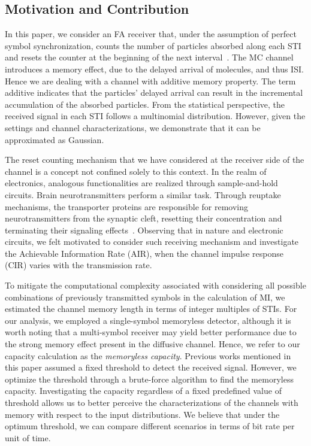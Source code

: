 \documentclass[journal]{IEEEtranTCOM}
\begin{document}
\subsection{Motivation and Contribution}

In this paper, we consider an FA receiver that, under the assumption of perfect symbol synchronization, counts the number of particles absorbed along each STI and resets the counter at the beginning of the next interval~\cite{ghavami2015information}. The MC channel introduces a memory effect, due to the delayed arrival of molecules, and thus ISI. Hence we are dealing with a channel with additive memory property. The term additive indicates that the particles' delayed arrival can result in the incremental accumulation of the absorbed particles.
From the statistical perspective, the received signal in each STI follows a multinomial distribution. However, given the settings and channel characterizations, we demonstrate that it can be approximated as Gaussian.

The reset counting mechanism that we have considered at the receiver side of the channel is a concept not confined solely to this context. In the realm of electronics, analogous functionalities are realized through sample-and-hold circuits. Brain neurotransmitters perform a similar task. Through reuptake mechanisms, the transporter proteins are responsible for removing neurotransmitters from the synaptic cleft, resetting their concentration and terminating their signaling effects~\cite{mukherjee2002regulation}. Observing that in nature and electronic circuits, we felt motivated to consider such receiving mechanism and investigate the Achievable Information Rate (AIR), when the channel impulse response (CIR) varies with the transmission rate.

To mitigate the computational complexity associated with considering all possible combinations of previously transmitted symbols in the calculation of MI, we estimated the channel memory length in terms of integer multiples of STIs. For our analysis, we employed a single-symbol memoryless detector, although it is worth noting that a multi-symbol receiver may yield better performance due to the strong memory effect present in the diffusive channel. Hence, we refer to our capacity calculation as the \emph{memoryless capacity}. Previous works mentioned in this paper assumed a fixed threshold to detect the received signal. However, we optimize the threshold through a brute-force algorithm to find the memoryless capacity. Investigating the capacity regardless of a fixed predefined value of threshold allows us to better perceive the characterizations of the channels with memory with respect to the input distributions. We believe that under the optimum threshold, we can compare different scenarios in terms of bit rate per unit of time.
\end{document}
